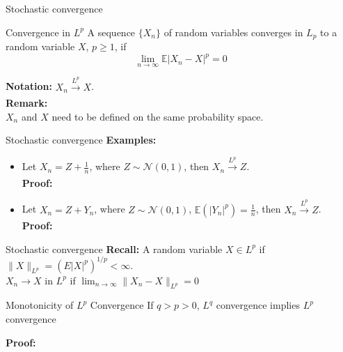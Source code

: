 \documentclass [aspectratio=169]{beamer}
\begin{document}
\begin{frame}{Stochastic convergence}
     \begin{block}{Convergence in $L^p$}
    A sequence $\{X_n\}$ of random variables converges in $L_p$ to a random variable $X$, $p \ge 1$, if 
$$
\lim_{n \to \infty} \mathbb{E}|X_n - X|^p = 0
$$
\end{block}
\vspace{0.1in}
    \textbf{Notation:}
    $X_n \xrightarrow[]{L^p} X$.\\
\vspace{0.1in}
\textbf{Remark:}\\
$X_n$ and $X$ need to be defined on the same probability space. 
\end{frame}

\begin{frame}{Stochastic convergence}
      \textbf{Examples:}\\
    \begin{itemize}
        \item Let $X_n = Z + \frac{1}{n}$, where $Z \sim \mathcal{N}(0,1)$, then $X_n \xrightarrow[]{L^p} Z$.\\
    \vspace{0.1in}
    \textbf{Proof:}\\
    \vspace{0.7in}
    \item Let $X_n = Z + Y_n$, where $Z \sim \mathcal{N}(0,1)$, $\mathbb{E}(|Y_n|^p) = \frac{1}{n}$, then $X_n \xrightarrow[]{L^p} Z$.\\
    \vspace{0.1in}
    \textbf{Proof:}\\
    \vspace{1in}
    \end{itemize}
\end{frame}

\begin{frame}{Stochastic convergence}
    \textbf{Recall:} A random variable $X \in L^p$ if $\|X\|_{L^p} = (E |X|^p)^{1/p} < \infty$.\\ 
    \quad \qquad $X_n\to X$ in $L^p$ if $\lim_{n\to \infty}\|X_n - X\|_{L^p}=0$ \\
    \begin{block}{Monotonicity of $L^p$ Convergence}
    If $q>p>0$, $L^q$ convergence implies $L^p$ convergence 
    \end{block}
    \textbf{Proof: }
    \vspace{1.8in}
\end{frame}
\end{document}
